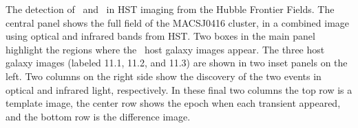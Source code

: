 \label{fig:SpockDetectionImages}
The detection of \spockone\ and \spocktwo\ in HST imaging from the Hubble Frontier Fields. The central panel shows the full field of the MACSJ0416 cluster, in a combined image using optical and infrared bands from HST.  Two boxes in the main panel highlight the regions where the \spock\ host galaxy images appear.  The three host galaxy images (labeled 11.1, 11.2, and 11.3) are shown in two inset panels on the left.  Two columns on the right side show the discovery of the two events in optical and infrared light, respectively.  In these final two columns the top row is a template image, the center row shows the epoch when each transient appeared, and the bottom row is the difference image.
